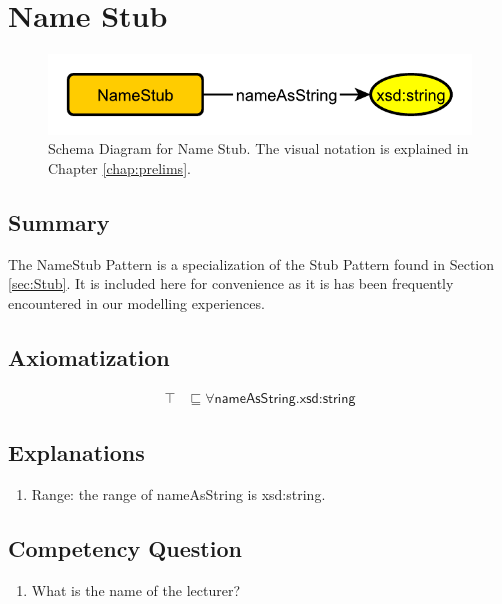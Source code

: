 \section{Name Stub}
\label{sec:Name}
\begin{figure}[h!]
\begin{center}
\includegraphics[width=.7\textwidth]{figures/name}
\end{center}
\caption{Schema Diagram for Name Stub. The visual notation is explained in Chapter \ref{chap:prelims}.}
\label{fig:Name}
\end{figure}
\subsection{Summary}
\label{sum:Name}
The \textsf{NameStub} Pattern is a specialization of the \textsf{Stub} Pattern found in Section \ref{sec:Stub}. It is included here for convenience as it is has been frequently encountered in our modelling experiences.

\subsection{Axiomatization}
\label{axs:Name}
\begin{align}
\top &\sqsubseteq \forall \textsf{nameAsString.xsd:string} 
\end{align}

\subsection{Explanations}
\label{exp:Name}
\begin{enumerate}
\item Range: the range of \textsf{nameAsString} is \textsf{xsd:string}.
\end{enumerate}

\subsection{Competency Question}
\label{cqs:Name}
\begin{enumerate}[CQ1.]
\item What is the name of the lecturer?
\end{enumerate}

\newpage

